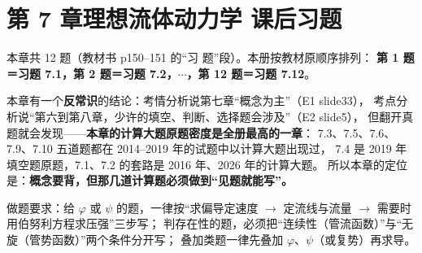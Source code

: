 \chapter*{第 7 章\quad 理想流体动力学 课后习题}

\begin{tishi}
本章共 12 题（教材书 p150--151 的“习 题”段）。本册按教材原顺序排列：
\textbf{第 1 题＝习题 7.1，第 2 题＝习题 7.2，$\cdots$，第 12 题＝习题 7.12}。

本章有一个\textbf{反常识}的结论：考情分析说第七章“概念为主”（E1 slide33），
考点分析说“第六到第八章，少许的填空、判断、选择题会涉及”（E2 slide5），
但翻开真题就会发现——\textbf{本章的计算大题原题密度是全册最高的一章}：
7.3、7.5、7.6、7.9、7.10 五道题都在 2014--2019 年的试题中以计算大题出现过，
7.4 是 2019 年填空题原题，7.1、7.2 的套路是 2016 年、2026 年的计算大题。
所以本章的定位是：\textbf{概念要背，但那几道计算题必须做到“见题就能写”。}

做题要求：给 $\varphi$ 或 $\psi$ 的题，一律按“求偏导定速度 $\to$ 定流线与流量 $\to$ 需要时用伯努利方程求压强”三步写；
判存在性的题，必须把“连续性（管流函数）”与“无旋（管势函数）”两个条件分开写；
叠加类题一律先叠加 $\varphi$、$\psi$（或复势）再求导。
\end{tishi}

